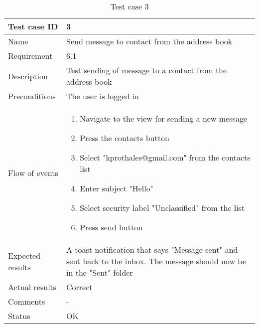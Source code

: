 		\begin{table}
			\begin{tabular}{l|p{10cm}}
				Test case ID & 3 \\ \hline
				Name & Send message to contact from the address book\\ \hline
				Requirement & 6.1\\ \hline
				Description & Test sending of message to a contact from the address book\\ \hline
				Preconditions & The user is logged in\\ \hline
				Flow of events & 
					\begin{enumerate}
						\item{}Navigate to the view for sending a new message
						\item{}Press the contacts button
						\item{}Select "kprothales@gmail.com" from the contacts list
						\item{}Enter subject "Hello"
						\item{}Select security label "Unclassified" from the list
						\item{}Press send button
					\end{enumerate} \\ \hline
				Expected results & A toast notification that says "Message sent" and sent back to the inbox. The message 					should now be in the "Sent" folder\\ \hline
				Actual results & Correct\\ \hline
				Comments & -\\ \hline
				Status & OK\\ \hline
			\end{tabular}
			\caption{Test case 3} \label{tab:case3}
		\end{table}

